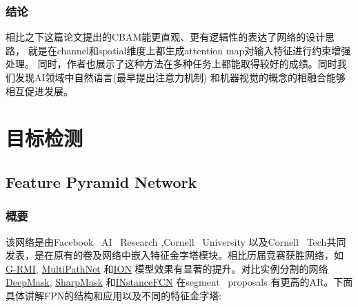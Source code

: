 \documentclass{article}
\begin{document}
\begin{CJK}{UTF8}{gbsn}
\subsubsection{结论}
相比之下这篇论文提出的CBAM能更直观、更有逻辑性的表达了网络的设计思路，
就是在channel和spatial维度上都生成attention map对输入特征进行约束增强处理。
同时，作者也展示了这种方法在多种任务上都能取得较好的成绩。同时我们发现AI领域中自然语言(最早提出注意力机制)
和机器视觉的概念的相融合能够相互促进发展。
\section{目标检测}
\subsection{Feature Pyramid Network}
\subsubsection{概要}
该网络是由Facebook \ AI \ Research ,Cornell \ University 以及Cornell \ Tech共同
发表，是在原有的卷及网络中嵌入特征金字塔模块。相比历届竞赛获胜网络，如\href{https://towardsdatascience.com/review-g-rmi-winner-in-2016-coco-detection-object-detection-af3f2eaf87e4}{G-RMI},
\href{https://towardsdatascience.com/review-multipath-mpn-1st-runner-up-in-2015-coco-detection-segmentation-object-detection-ea9741e7c413}{MultiPathNet}
和\href{https://towardsdatascience.com/review-ion-inside-outside-net-2nd-runner-up-in-2015-coco-detection-object-detection-da19993f4766}{ION}
模型效果有显著的提升。对比实例分割的网络\href{https://towardsdatascience.com/review-deepmask-instance-segmentation-30327a072339}{DeepMask},
\href{https://towardsdatascience.com/review-sharpmask-instance-segmentation-6509f7401a61}{SharpMask}
和\href{https://towardsdatascience.com/review-instancefcn-instance-sensitive-score-maps-instance-segmentation-dbfe67d4ee92}{INstanceFCN}
在segment \ proposals 有更高的AR。下面具体讲解FPN的结构和应用以及不同的特征金字塔:


\end{CJK}
\end{document}

